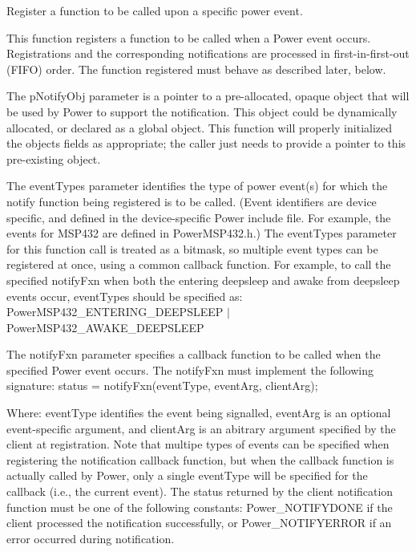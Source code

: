 Register a function to be called upon a specific power event. 

This function registers a function to be called when a Power event occurs. Registrations and the corresponding notifications are processed in first-\/in-\/first-\/out (F\+I\+F\+O) order. The function registered must behave as described later, below.

The p\+Notify\+Obj parameter is a pointer to a pre-\/allocated, opaque object that will be used by Power to support the notification. This object could be dynamically allocated, or declared as a global object. This function will properly initialized the object\textquotesingle{}s fields as appropriate; the caller just needs to provide a pointer to this pre-\/existing object.

The event\+Types parameter identifies the type of power event(s) for which the notify function being registered is to be called. (Event identifiers are device specific, and defined in the device-\/specific Power include file. For example, the events for M\+S\+P432 are defined in Power\+M\+S\+P432.\+h.) The event\+Types parameter for this function call is treated as a bitmask, so multiple event types can be registered at once, using a common callback function. For example, to call the specified notify\+Fxn when both the entering deepsleep and awake from deepsleep events occur, event\+Types should be specified as\+: Power\+M\+S\+P432\+\_\+\+E\+N\+T\+E\+R\+I\+N\+G\+\_\+\+D\+E\+E\+P\+S\+L\+E\+E\+P $\vert$ Power\+M\+S\+P432\+\_\+\+A\+W\+A\+K\+E\+\_\+\+D\+E\+E\+P\+S\+L\+E\+E\+P

The notify\+Fxn parameter specifies a callback function to be called when the specified Power event occurs. The notify\+Fxn must implement the following signature\+: status = notify\+Fxn(event\+Type, event\+Arg, client\+Arg);

Where\+: event\+Type identifies the event being signalled, event\+Arg is an optional event-\/specific argument, and client\+Arg is an abitrary argument specified by the client at registration. Note that multipe types of events can be specified when registering the notification callback function, but when the callback function is actually called by Power, only a single event\+Type will be specified for the callback (i.\+e., the current event). The status returned by the client notification function must be one of the following constants\+: Power\+\_\+\+N\+O\+T\+I\+F\+Y\+D\+O\+N\+E if the client processed the notification successfully, or Power\+\_\+\+N\+O\+T\+I\+F\+Y\+E\+R\+R\+O\+R if an error occurred during notification.

